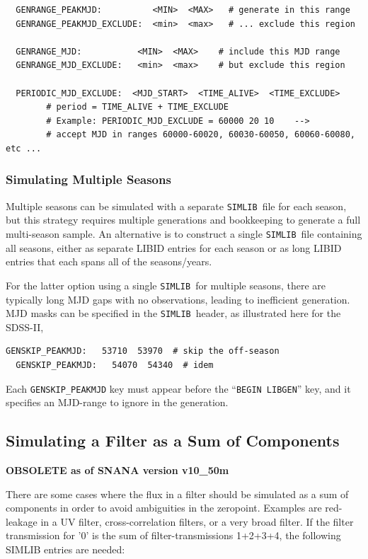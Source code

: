 \documentclass[12pt]{article}
\newcommand{\simlib}{{\tt SIMLIB}}
\begin{document}
{\begin{verbatim}
  GENRANGE_PEAKMJD:          <MIN>  <MAX>   # generate in this range
  GENRANGE_PEAKMJD_EXCLUDE:  <min>  <max>   # ... exclude this region

  GENRANGE_MJD:           <MIN>  <MAX>    # include this MJD range
  GENRANGE_MJD_EXCLUDE:   <min>  <max>    # but exclude this region

  PERIODIC_MJD_EXCLUDE:  <MJD_START>  <TIME_ALIVE>  <TIME_EXCLUDE>
        # period = TIME_ALIVE + TIME_EXCLUDE
        # Example: PERIODIC_MJD_EXCLUDE = 60000 20 10    -->
        # accept MJD in ranges 60000-60020, 60030-60050, 60060-60080, etc ...
\end{verbatim}


\subsubsection{Simulating Multiple Seasons}
\label{subsec:multi_seasons}
Multiple seasons can be simulated with a separate \simlib\ file
for each season, but this strategy requires multiple generations
and bookkeeping to generate a full multi-season sample. 
An alternative is to construct a single \simlib\ file containing 
all seasons, either as separate LIBID entries for each season
or as long LIBID entries that each spans all of
the seasons/years.

For the latter option using a single \simlib\ for multiple seasons,
there are typically long MJD gaps with no observations, leading
to inefficient generation. MJD masks can be specified in the
\simlib\ header, as illustrated here for the SDSS-II,
%
\begin{Verbatim}[frame=single]
  GENSKIP_PEAKMJD:   53710  53970  # skip the off-season
  GENSKIP_PEAKMJD:   54070  54340  # idem
\end{Verbatim}
%
Each {\tt GENSKIP\_PEAKMJD} key must appear before the
``{\tt BEGIN LIBGEN}'' key, and it specifies an MJD-range
to ignore in the generation.

   \clearpage
   \subsection{Simulating a Filter as a Sum of Components}
   \label{subsec:filterSum}

{\Large\bf OBSOLETE as of SNANA version v10\_50m}
\medskip

There are some cases where the flux in a filter should be 
simulated as a sum of components in order to avoid ambiguities 
in the zeropoint. Examples are red-leakage in a UV filter,
cross-correlation filters, or a very broad filter.
If the filter transmission for '0' is the sum of 
filter-transmissions 1+2+3+4, the following SIMLIB 
entries are needed:

}
\end{document}
